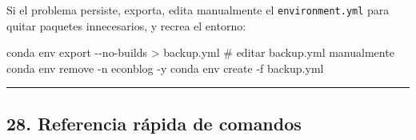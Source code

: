 \documentclass[
  doc,
  floatsintext,
  longtable,
  a4paper,
  nolmodern,
  notxfonts,
  notimes,
  12pt,
  colorlinks=true,linkcolor=blue,citecolor=blue,urlcolor=blue]{apa7}
\newenvironment{Shaded}{\begin{snugshade}}{\end{snugshade}}
\newcommand{\AttributeTok}[1]{\textcolor[rgb]{0.40,0.45,0.13}{#1}}
\newcommand{\CommentTok}[1]{\textcolor[rgb]{0.37,0.37,0.37}{#1}}
\newcommand{\ExtensionTok}[1]{\textcolor[rgb]{0.00,0.23,0.31}{#1}}
\newcommand{\NormalTok}[1]{\textcolor[rgb]{0.00,0.23,0.31}{#1}}
\newcommand{\OperatorTok}[1]{\textcolor[rgb]{0.37,0.37,0.37}{#1}}
\begin{document}
Si el problema persiste, exporta, edita manualmente el
\texttt{environment.yml} para quitar paquetes innecesarios, y recrea el
entorno:

\begin{Shaded}
\begin{Highlighting}[]
\ExtensionTok{conda}\NormalTok{ env export }\AttributeTok{{-}{-}no{-}builds} \OperatorTok{\textgreater{}}\NormalTok{ backup.yml}
\CommentTok{\# editar backup.yml manualmente}
\ExtensionTok{conda}\NormalTok{ env remove }\AttributeTok{{-}n}\NormalTok{ econblog }\AttributeTok{{-}y}
\ExtensionTok{conda}\NormalTok{ env create }\AttributeTok{{-}f}\NormalTok{ backup.yml}
\end{Highlighting}
\end{Shaded}

\begin{center}\rule{0.5\linewidth}{0.5pt}\end{center}

\subsection{28. Referencia rápida de
comandos}\label{referencia-ruxe1pida-de-comandos}
\end{document}
